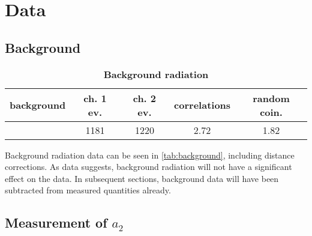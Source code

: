 \chapter{Data}

\section{Background}
\begin{table}
	\centering
	\caption[Background radiation]{\textbf{Background radiation}}
	\label{tab:background}
	\begin{tabular}{c|SSSS}
		\toprule
		background	&	{ch. 1 ev.}	&	{ch. 2 ev.}	&	{correlations}	&	{random coin.}	\\
		\midrule
			&	1181	&	1220	&	2.72	&	1.82	\\
		\bottomrule
	\end{tabular}
\end{table}

Background radiation data can be seen in \autoref{tab:background}, including distance corrections.
As data suggests, background radiation will not have a significant effect on the data.
In subsequent sections, background data will have been subtracted from measured quantities already.

\section{Measurement of $a_2$}
